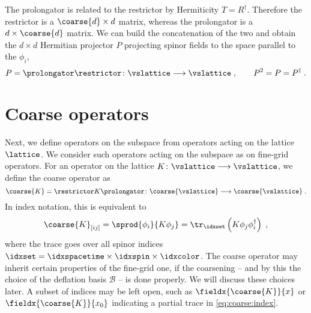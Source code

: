The prolongator is related to the restrictor by Hermiticity $T = R^{\dagger}$.
Therefore the restrictor is a $\coarse{d} \times d$ matrix, whereas the prolongator is a $d \times \coarse{d}$ matrix.
We can build the concatenation of the two and obtain the $d \times d$ Hermitian projector $P$ projecting spinor fields to the space parallel to the $\phi_{i}$,
\begin{equation} \label{eq:P}
P = \prolongator \restrictor \colon \vslattice \longrightarrow \vslattice \;,
\qquad
P^{2} = P = P^{\dagger} \;.
\end{equation}

\section{Coarse operators}

Next, we define operators on the subspace from operators acting on the lattice $\lattice$.
We consider such operators acting on the subspace as  on fine-grid operators.
For an operator on the lattice $K \colon \vslattice \longrightarrow \vslattice$, we define the coarse operator as
\begin{equation} \label{eq:sd:coarse:op}
\coarse{K} = \restrictor K \prolongator \colon \coarse{\vslattice} \longrightarrow \coarse{\vslattice} \;.
\end{equation}
In index notation, this is equivalent to
\begin{equation} \label{eq:coarse:index}
\coarse{K}_{[i j]} =
\sprod{ \phi_{i} }{ K \phi_{j} } =
\tr_{\idxset} \left( K \phi_j \phi_i^\dagger \right) \;,
\end{equation}
where the trace goes over all spinor indices $\idxset = \idxspacetime \times \idxspin \times \idxcolor$.
The coarse operator may inherit certain properties of the fine-grid one, if the coarsening -- and by this the choice of the deflation basis $\mathcal{B}$ --  is done properly.
We will discuss these choices later.
A subset of indices may be left open, such as $\fieldx{\coarse{K}}{x}$ or $\fieldx{\coarse{K}}{x_0}$ indicating a partial trace in \cref{eq:coarse:index}.

